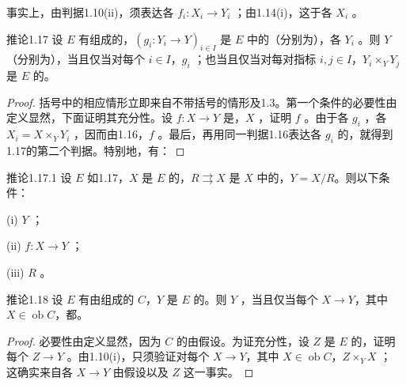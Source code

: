 事实上，由判据1.10(ii)，须表达各 $f_i:X_i\to Y_i$ ；由1.14(i)，这于各 $X_i$ 。
\begin{SGAresult}{推论}{1.17}
设 $E$ 有组成的，$(g_i:Y_i\to Y)_{i\in I}$ 是 $E$ 中的（分别为），各 $Y_i$ 。则 $Y$ （分别为），当且仅当对每个 $i\in I$，$g_i$ ；也当且仅当对每对指标 $i,j\in I$，$Y_i\times_Y Y_j$ 是 $E$ 的。
\end{SGAresult}
\begin{proof}
括号中的相应情形立即来自不带括号的情形及1.3。第一个条件的必要性由定义显然，下面证明其充分性。设 $f:X\to Y$ 是，$X$ ，证明 $f$ 。由于各 $g_i$ ，各 $X_i=X\times_Y Y_i$ ，因而由1.16，$f$ 。最后，再用同一判据1.16表达各 $g_i$ 的，就得到1.17的第二个判据。特别地，有：
\end{proof}
\begin{SGAresult}{推论}{1.17.1}
设 $E$ 如1.17，$X$ 是 $E$ 的，$R\rightrightarrows X$ 是 $X$ 中的，$Y=X/R$。则以下条件：

(i) $Y$ ；

(ii) $f:X\to Y$ ；

(iii) $R$ 。
\end{SGAresult}
\begin{SGAresult}{推论}{1.18}
设 $E$ 有由组成的 $C$，$Y$ 是 $E$ 的。则 $Y$ ，当且仅当每个 $X\to Y$，其中 $X\in\operatorname{ob}C$，都。
\end{SGAresult}
\begin{proof}
必要性由定义显然，因为 $C$ 的由假设。为证充分性，设 $Z$ 是 $E$ 的，证明每个 $Z\to Y$ 。由1.10(i)，只须验证对每个 $X\to Y$，其中 $X\in\operatorname{ob}C$，$Z\times_Y X$ ；
这确实来自各 $X\to Y$ 由假设以及 $Z$ 这一事实。
\end{proof}
